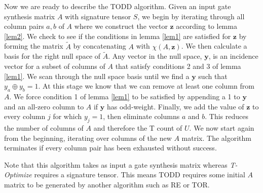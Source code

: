 \documentclass[titlepage]{article}
\theoremstyle{definition}
\theoremstyle{problem}
\theoremstyle{lemma}
\begin{document}
		Now we are ready to describe the TODD algorithm. Given an input gate synthesis matrix $A$ with signature tensor $S$, we begin by iterating through all column pairs $a,b$ of $A$ where we construct the vector $\mathbf{z}$ according to lemma \ref{lem2}. We check to see if the conditions in lemma \ref{lem1} are satisfied for $\mathbf{z}$ by forming the matrix $\tilde{A}$ by concatenating $A$ with $\chi(A,\mathbf{z})$. We then calculate a basis for the right null space of $\tilde{A}$. Any vector in the null space, $\mathbf{y}$, is an incidence vector for a subset of columns of $A$ that satisfy conditions 2 and 3 of lemma \ref{lem1}. We scan through the null space basis until we find a $\mathbf{y}$ such that $y_a \oplus y_b = 1$. At this stage we know that we can remove at least one column from $A$. We force condition 1 of lemma \ref{lem1} to be satisfied by appending a 1 to $\mathbf{y}$ and an all-zero column to $A$ if $\mathbf{y}$ has odd-weight. Finally, we add the value of $\mathbf{z}$ to every column $j$ for which $y_j = 1$, then eliminate columns $a$ and $b$. This reduces the number of columns of $A$ and therefore the T count of $U$. We now start again from the beginning, iterating over columns of the new $A$ matrix. The algorithm terminates if every column pair has been exhausted without success.
		
		Note that this algorithm takes as input a gate synthesis matrix whereas \emph{T-Optimize} requires a signature tensor. This means TODD requires some initial $A$ matrix to be generated by another algorithm such as RE or TOR.
\end{document}
